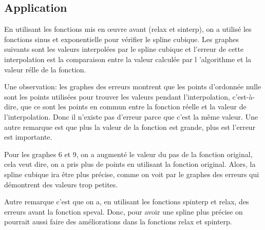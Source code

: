 \documentclass[a4paper,11pt]{article}
\begin{document}
\subsection{Application}

En utilisant les fonctions mis en œuvre avant (relax et sinterp), on a utilisé les fonctions sinus
et exponentielle pour vérifier le spline cubique. Les graphes suivants sont les valeurs interpolées par le
spline cubique  et l'erreur de cette  interpolation est la  comparaison entre la
valeur calculée par l 'algorithme et la valeur rélle de la fonction.

 Une observation: les graphes des erreurs montrent que les points d'ordonnée 
 nulle  sont  les points utilisées  pour trouver  les valeurs pendant l'interpolation,
 c'est-à-dire, que ce sont les points en commun entre la fonction
réelle et la valeur de l'interpolation. Donc il n'existe pas d'erreur parce que c'est la même valeur.
Une autre remarque  est que plus la  valeur de la fonction est  grande, plus est
l'erreur est importante.

Pour les graphes 6 et 9, on a  augmenté le valeur du pas de la fonction original,
cela  veut   dire,  on  a  pris   plus  de  points  en   utilisant  la  fonction
original. Alors, la  spline cubique ira être plus précise, comme  on voit par le
graphes des erreurs qui démontrent des valeurs trop petites.

Autre remarque c'est que on a, en utilisant les fonctions spinterp et 
relax, des erreurs avant la fonction speval. Donc, pour avoir une spline plus précise on pourrait aussi
faire des améliorations dans la fonctions relax et spinterp.
\end{document}
